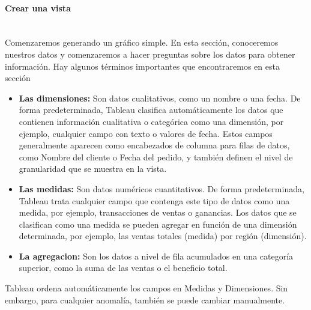 \documentclass[12pt,letterpaper]{article}
\begin{document}
    \paragraph{\Large Crear una vista\\ \\}
    Comenzaremos generando un gráfico simple. En esta sección, conoceremos nuestros datos y comenzaremos a hacer preguntas sobre los datos para obtener información. Hay algunos términos importantes que encontraremos en esta sección
    \begin{itemize}
        \item \textbf{Las dimensiones:} Son datos cualitativos, como un nombre o una fecha. De forma predeterminada, Tableau clasifica automáticamente los datos que contienen información cualitativa o categórica como una dimensión, por ejemplo, cualquier campo con texto o valores de fecha. Estos campos generalmente aparecen como encabezados de columna para filas de datos, como Nombre del cliente o Fecha del pedido, y también definen el nivel de granularidad que se muestra en la vista.
        \item \textbf{Las medidas:} Son datos numéricos cuantitativos. De forma predeterminada, Tableau trata cualquier campo que contenga este tipo de datos como una medida, por ejemplo, transacciones de ventas o ganancias. Los datos que se clasifican como una medida se pueden agregar en función de una dimensión determinada, por ejemplo, las ventas totales (medida) por región (dimensión).
        \item \textbf{La agregacion:} Son los datos a nivel de fila acumulados en una categoría superior, como la suma de las ventas o el beneficio total.
    \end{itemize}
    Tableau ordena automáticamente los campos en Medidas y Dimensiones. Sin embargo, para cualquier anomalía, también se puede cambiar manualmente.
\end{document}
